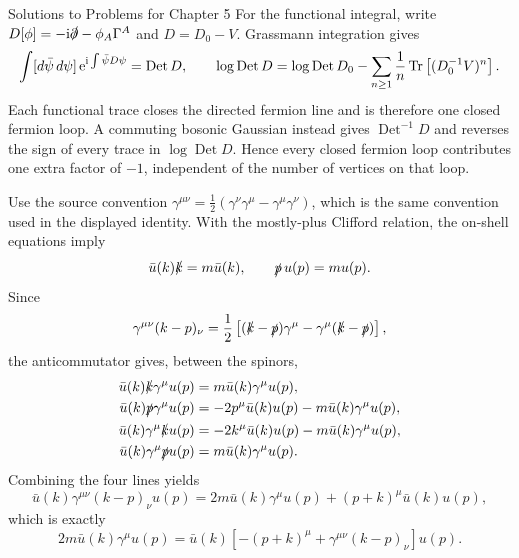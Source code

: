 \begin{bankssolutions}{Solutions to Problems for Chapter 5}
For the functional integral, write
$D[\phi]=-\mathrm{i}\slashed\partial-\phi_A\Gamma^A$ and $D=D_0-V$. Grassmann
integration gives
\begin{equation*}
 \int[d\bar\psi\,d\psi]\,\mathrm{e}^{\mathrm{i}\int\bar\psi D\psi}
 =\operatorname{Det}D,
 \qquad
 \log\operatorname{Det}D
 =\log\operatorname{Det}D_0
 -\sum_{n\geq1}\frac1n\operatorname{Tr}\left[(D_0^{-1}V)^n\right].
\end{equation*}
Each functional trace closes the directed fermion line and is therefore one
closed fermion loop. A commuting bosonic Gaussian instead gives
$\operatorname{Det}^{-1}D$ and reverses the sign of every trace in
$\log\operatorname{Det}D$. Hence every closed fermion loop contributes one extra
factor of $-1$, independent of the number of vertices on that loop.

Use the source convention
$\gamma^{\mu\nu}=\frac12(\gamma^\nu\gamma^\mu-\gamma^\mu\gamma^\nu)$,
which is the same convention used in the displayed identity. With the
mostly-plus Clifford relation, the on-shell equations imply
\begin{equation*}
 \bar u(k)\slashed k=m\bar u(k),
 \qquad \slashed p\,u(p)=m u(p).
\end{equation*}
Since
\begin{equation*}
 \gamma^{\mu\nu}(k-p)_\nu
 =\frac12\left[(\slashed k-\slashed p)\gamma^\mu
 -\gamma^\mu(\slashed k-\slashed p)\right],
\end{equation*}
the anticommutator gives, between the spinors,
\begin{align*}
 \bar u(k)\slashed k\gamma^\mu u(p)&=m\bar u(k)\gamma^\mu u(p),\\
 \bar u(k)\slashed p\gamma^\mu u(p)&=-2p^\mu\bar u(k)u(p)-m\bar u(k)\gamma^\mu u(p),\\
 \bar u(k)\gamma^\mu\slashed k u(p)&=-2k^\mu\bar u(k)u(p)-m\bar u(k)\gamma^\mu u(p),\\
 \bar u(k)\gamma^\mu\slashed p u(p)&=m\bar u(k)\gamma^\mu u(p).
\end{align*}
Combining the four lines yields
\begin{equation*}
 \bar u(k)\gamma^{\mu\nu}(k-p)_\nu u(p)
 =2m\bar u(k)\gamma^\mu u(p)+(p+k)^\mu\bar u(k)u(p),
\end{equation*}
which is exactly
\begin{equation*}
 2m\bar u(k)\gamma^\mu u(p)=\bar u(k)
 \left[-(p+k)^\mu+\gamma^{\mu\nu}(k-p)_\nu\right]u(p).
\end{equation*}


\end{bankssolutions}
